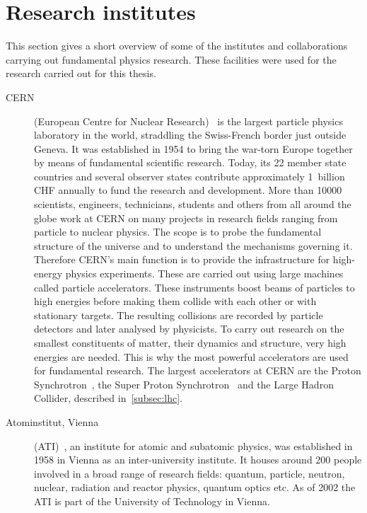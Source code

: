\section{Research institutes}
This section gives a short overview of some of the institutes and collaborations carrying out fundamental physics research. These facilities were used for the research carried out for this thesis. 


\begin{description}
\item[CERN] (European Centre for Nuclear Research)~\cite{CERN:00000} is the largest particle physics laboratory in the world, straddling the Swiss-French border just outside Geneva. It was established in 1954 to bring the war-torn Europe together by means of fundamental scientific research. Today, its 22 member state countries and several observer states contribute approximately 1~billion CHF annually to fund the research and development. More than 10000 scientists, engineers, technicians, students and others from all around the globe work at CERN on many projects in research fields ranging from particle to nuclear physics. The scope is to probe the fundamental structure of the universe and to understand the mechanisms governing it. Therefore CERN's main function is to provide the infrastructure for high-energy physics experiments. These are carried out using large machines called particle accelerators. These instruments boost beams of particles to high energies before making them collide with each other or with stationary targets. The resulting collisions are recorded by particle detectors and later analysed by physicists. To carry out research on the smallest constituents of matter, their dynamics and structure, very high energies are needed. This is why the most powerful accelerators are used for fundamental research. The largest accelerators at CERN are the Proton Synchrotron~\cite{Regenstreif:342915}, the Super Proton Synchrotron~\cite{Mills:133232} and the Large Hadron Collider, described in~\ref{subsec:lhc}.



\item[Atominstitut, Vienna] (ATI)~\cite{AtomInst:00000}, an institute for atomic and subatomic physics, was established in 1958 in Vienna as an inter-university institute. It houses around 200 people involved in a broad range of research fields: quantum, particle, neutron, nuclear, radiation and reactor physics, quantum optics etc. As of 2002 the ATI is part of the University of Technology in Vienna.


\end{description}
